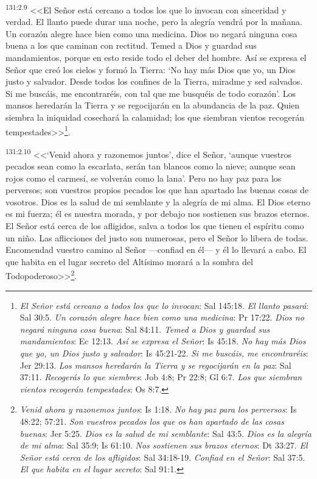 \par 
\textsuperscript{131:2.9} <<El Señor está cercano a todos los que lo invocan con sinceridad y verdad. El llanto puede durar una noche, pero la alegría vendrá por la mañana. Un corazón alegre hace bien como una medicina. Dios no negará ninguna cosa buena a los que caminan con rectitud. Temed a Dios y guardad sus mandamientos, porque en esto reside todo el deber del hombre. Así se expresa el Señor que creó los cielos y formó la Tierra: `No hay más Dios que yo, un Dios justo y salvador. Desde todos los confines de la Tierra, miradme y sed salvados. Si me buscáis, me encontraréis, con tal que me busquéis de todo corazón'. Los mansos heredarán la Tierra y se regocijarán en la abundancia de la paz. Quien siembra la iniquidad cosechará la calamidad; los que siembran vientos recogerán tempestades>>\footnote{\textit{El Señor está cercano a todos los que lo invocan}: Sal 145:18. \textit{El llanto pasará}: Sal 30:5. \textit{Un corazón alegre hace bien como una medicina}: Pr 17:22. \textit{Dios no negará ninguna cosa buena}: Sal 84:11. \textit{Temed a Dios y guardad sus mandamientos}: Ec 12:13. \textit{Así se expresa el Señor}: Is 45:18. \textit{No hay más Dios que yo, un Dios justo y salvador}: Is 45:21-22. \textit{Si me buscáis, me encontraréis}: Jer 29:13. \textit{Los mansos heredarán la Tierra y se regocijarán en la paz}: Sal 37:11. \textit{Recogerás lo que siembres}: Job 4:8; Pr 22:8; Gl 6:7. \textit{Los que siembran vientos recogerán tempestades}: Os 8:7.}.

\par 
\textsuperscript{131:2.10} <<`Venid ahora y razonemos juntos', dice el Señor, `aunque vuestros pecados sean como la escarlata, serán tan blancos como la nieve; aunque sean rojos como el carmesí, se volverán como la lana'. Pero no hay paz para los perversos; son vuestros propios pecados los que han apartado las buenas cosas de vosotros. Dios es la salud de mi semblante y la alegría de mi alma. El Dios eterno es mi fuerza; él es nuestra morada, y por debajo nos sostienen sus brazos eternos. El Señor está cerca de los afligidos, salva a todos los que tienen el espíritu como un niño. Las aflicciones del justo son numerosas, pero el Señor lo libera de todas. Encomendad vuestro camino al Señor ---confiad en él--- y él lo llevará a cabo. El que habita en el lugar secreto del Altísimo morará a la sombra del Todopoderoso>>\footnote{\textit{Venid ahora y razonemos juntos}: Is 1:18. \textit{No hay paz para los perversos}: Is 48:22; 57:21. \textit{Son vuestros pecados los que os han apartado de las cosas buenas}: Jer 5:25. \textit{Dios es la salud de mi semblante}: Sal 43:5. \textit{Dios es la alegría de mi alma}: Sal 35:9; Is 61:10. \textit{Nos sostienen sus brazos eternos}: Dt 33:27. \textit{El Señor está cerca de los afligidos}: Sal 34:18-19. \textit{Confiad en el Señor}: Sal 37:5. \textit{El que habita en el lugar secreto}: Sal 91:1.}.

